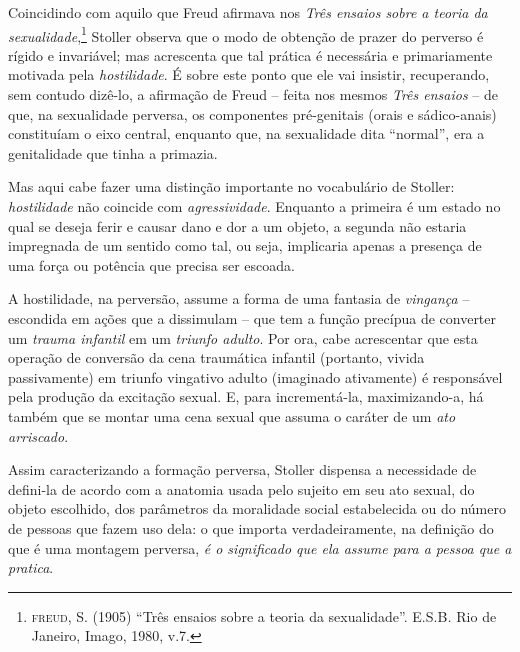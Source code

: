 Coincidindo com aquilo que Freud afirmava nos \emph{Três ensaios sobre a
teoria da sexualidade},\footnote{\textsc{freud}, S. (1905) ``Três
  ensaios sobre a teoria da sexualidade''. E.S.B\emph{.} Rio de Janeiro,
  Imago, 1980, v.7.} Stoller observa que o modo de obtenção de prazer do
perverso é rígido e invariável; mas acrescenta que tal prática é
necessária e primariamente motivada pela \emph{hostilidade}. É sobre
este ponto que ele vai insistir, recuperando, sem contudo dizê-lo, a
afirmação de Freud -- feita nos mesmos \emph{Três ensaios} -- de que, na
sexualidade perversa, os componentes pré-genitais (orais e sádico-anais)
constituíam o eixo central, enquanto que, na sexualidade dita
``normal'', era a genitalidade que tinha a primazia.

Mas aqui cabe fazer uma distinção importante no vocabulário de Stoller:
\emph{hostilidade} não coincide com \emph{agressividade}. Enquanto a
primeira é um estado no qual se deseja ferir e causar dano e dor a um
objeto, a segunda não estaria impregnada de um sentido como tal, ou
seja, implicaria apenas a presença de uma força ou potência que precisa
ser escoada.

A hostilidade, na perversão, assume a forma de uma fantasia de
\emph{vingança} -- escondida em ações que a dissimulam -- que tem a
função precípua de converter um \emph{trauma infantil} em um
\emph{triunfo adulto}. Por ora, cabe acrescentar que esta operação de
conversão da cena traumática infantil (portanto, vivida passivamente) em
triunfo vingativo adulto (imaginado ativamente) é responsável pela
produção da excitação sexual. E, para incrementá-la, maximizando-a, há
também que se montar uma cena sexual que assuma o caráter de um
\emph{ato arriscado}.

Assim caracterizando a formação perversa, Stoller dispensa a necessidade
de defini-la de acordo com a anatomia usada pelo sujeito em seu ato
sexual, do objeto escolhido, dos parâmetros da moralidade social
estabelecida ou do número de pessoas que fazem uso dela: o que importa
verdadeiramente, na definição do que é uma montagem perversa, \emph{é o
significado que ela assume para a pessoa que a pratica}.

